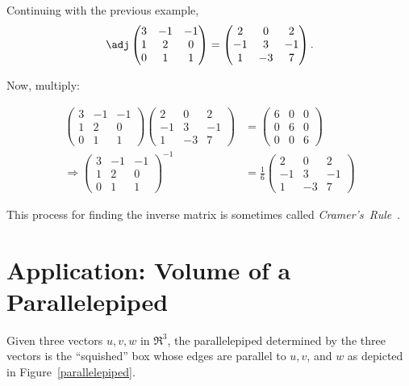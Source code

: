 \begin{example}
Continuing with the previous example,
\[
\adj \begin{pmatrix}
3 & -1 & -1 \\
1 & 2 & 0 \\
0 & 1 & 1 \\
\end{pmatrix} = \begin{pmatrix}
2 & 0 & 2 \\
-1 & 3 & -1 \\
1 & -3 & 7 \\
\end{pmatrix}.
\]

Now, multiply:

\begin{align*}
\begin{pmatrix}
3 & -1 & -1 \\
1 & 2 & 0 \\
0 & 1 & 1
\end{pmatrix}
\begin{pmatrix}
2 & 0 & 2 \\
-1 & 3 & -1 \\
1 & -3 & 7
\end{pmatrix}
&=
\begin{pmatrix}
6 & 0 & 0 \\
0 & 6 & 0 \\
0 & 0 & 6
\end{pmatrix} \\[1mm]
\Rightarrow \begin{pmatrix}
3 & -1 & -1 \\
1 & 2 & 0 \\
0 & 1 & 1
\end{pmatrix}^{-1}
& = \frac{1}{6}\begin{pmatrix}
2 & 0 & 2 \\
-1 & 3 & -1 \\
1 & -3 & 7
\end{pmatrix}
\end{align*}

This process for finding the inverse matrix is sometimes called \emph{Cramer's~Rule}~.
\end{example}

\section{Application: Volume of a Parallelepiped}

Given three vectors $u,v,w$ in $\Re^3$, the parallelepiped determined by the three vectors is the ``squished'' box whose edges are parallel to $u, v$, and $w$ as depicted in Figure~\ref{parallelepiped}.

